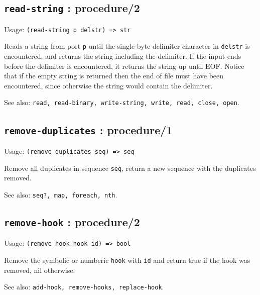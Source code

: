 \documentclass[
]{article}
\newcommand{\passthrough}[1]{#1}
\begin{document}
\hypertarget{read-string-procedure2-1}{%
\subsection{\texorpdfstring{\texttt{read-string} :
procedure/2}{read-string : procedure/2}}\label{read-string-procedure2-1}}

Usage: \passthrough{\lstinline!(read-string p delstr) => str!}

Reads a string from port \passthrough{\lstinline!p!} until the
single-byte delimiter character in \passthrough{\lstinline!delstr!} is
encountered, and returns the string including the delimiter. If the
input ends before the delimiter is encountered, it returns the string up
until EOF. Notice that if the empty string is returned then the end of
file must have been encountered, since otherwise the string would
contain the delimiter.

See also:
\passthrough{\lstinline!read, read-binary, write-string, write, read, close, open!}.

\hypertarget{remove-duplicates-procedure1-1}{%
\subsection{\texorpdfstring{\texttt{remove-duplicates} :
procedure/1}{remove-duplicates : procedure/1}}\label{remove-duplicates-procedure1-1}}

Usage: \passthrough{\lstinline!(remove-duplicates seq) => seq!}

Remove all duplicates in sequence \passthrough{\lstinline!seq!}, return
a new sequence with the duplicates removed.

See also: \passthrough{\lstinline!seq?, map, foreach, nth!}.

\hypertarget{remove-hook-procedure2-1}{%
\subsection{\texorpdfstring{\texttt{remove-hook} :
procedure/2}{remove-hook : procedure/2}}\label{remove-hook-procedure2-1}}

Usage: \passthrough{\lstinline!(remove-hook hook id) => bool!}

Remove the symbolic or numberic \passthrough{\lstinline!hook!} with
\passthrough{\lstinline!id!} and return true if the hook was removed,
nil otherwise.

See also:
\passthrough{\lstinline!add-hook, remove-hooks, replace-hook!}.
\end{document}
